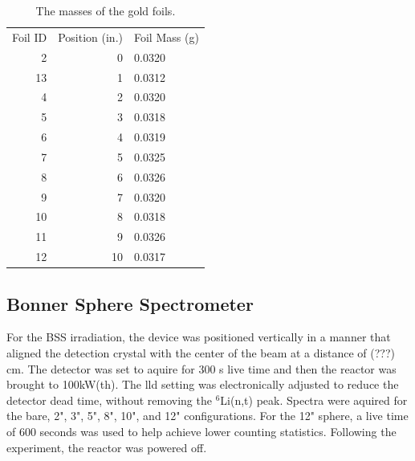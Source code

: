 \begin{table}[h]\centering
\label{tab:au_masses}
\caption{The masses of the gold foils.}
\begin{tabular}{ r | r | l }
\toprule
Foil ID  & Position (in.)     &   Foil Mass (g)\\
2 & 0 & 0.0320\\
13 & 1 & 0.0312\\
4 & 2 & 0.0320\\
5 & 3 & 0.0318\\
6 & 4 & 0.0319\\
7 & 5 & 0.0325\\
8 & 6 & 0.0326\\
9 & 7 & 0.0320\\
10 & 8 & 0.0318\\
11 & 9 & 0.0326\\
12 & 10 & 0.0317\\
\end{tabular}
\end{table}

\subsection{Bonner Sphere Spectrometer}

For the BSS irradiation, the device was positioned vertically in a manner that aligned the detection crystal with the center of the beam at a distance of (???) cm.
The detector was set to aquire for 300 s live time and then the reactor was brought to 100kW(th).
The lld setting was electronically adjusted to reduce the detector dead time, without removing the $^6$Li(n,t) peak.
Spectra were aquired for the bare, 2", 3", 5", 8", 10", and 12" configurations.
For the 12" sphere, a live time of 600 seconds was used to help achieve lower counting statistics.
Following the experiment, the reactor was powered off.





